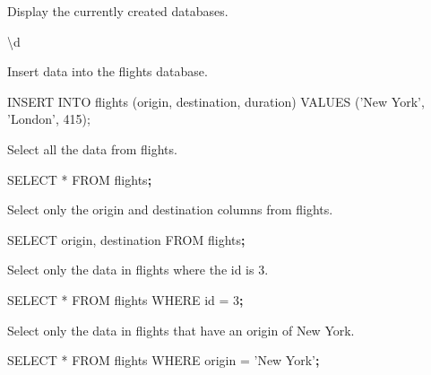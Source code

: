 \documentclass[]{book}
\newenvironment{Shaded}{\begin{snugshade}}{\end{snugshade}}
\newcommand{\ExtensionTok}[1]{#1}
\newcommand{\KeywordTok}[1]{\textcolor[rgb]{0.13,0.29,0.53}{\textbf{#1}}}
\newcommand{\NormalTok}[1]{#1}
\newcommand{\StringTok}[1]{\textcolor[rgb]{0.31,0.60,0.02}{#1}}
\begin{document}
Display the currently created databases.

\begin{Shaded}
\begin{Highlighting}[]
\NormalTok{\textbackslash{}}\ExtensionTok{d}
\end{Highlighting}
\end{Shaded}

Insert data into the flights database.

\begin{Shaded}
\begin{Highlighting}[]
\ExtensionTok{INSERT}\NormalTok{ INTO flights (origin, destination, duration) }\ExtensionTok{VALUES}\NormalTok{ (}\StringTok{'New York'}\NormalTok{, }\StringTok{'London'}\NormalTok{, 415);}
\end{Highlighting}
\end{Shaded}

Select all the data from flights.

\begin{Shaded}
\begin{Highlighting}[]
\ExtensionTok{SELECT}\NormalTok{ * FROM flights}\KeywordTok{;}
\end{Highlighting}
\end{Shaded}

Select only the origin and destination columns from flights.

\begin{Shaded}
\begin{Highlighting}[]
\ExtensionTok{SELECT}\NormalTok{ origin, destination FROM flights}\KeywordTok{;}
\end{Highlighting}
\end{Shaded}

Select only the data in flights where the id is 3.

\begin{Shaded}
\begin{Highlighting}[]
\ExtensionTok{SELECT}\NormalTok{ * FROM flights WHERE id = 3}\KeywordTok{;}
\end{Highlighting}
\end{Shaded}

Select only the data in flights that have an origin of New York.

\begin{Shaded}
\begin{Highlighting}[]
\ExtensionTok{SELECT}\NormalTok{ * FROM flights WHERE origin = }\StringTok{'New York'}\KeywordTok{;}
\end{Highlighting}
\end{Shaded}
\end{document}
